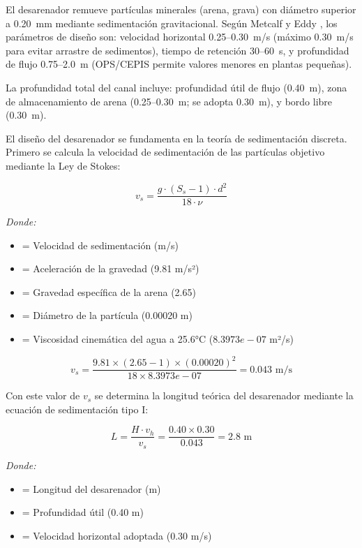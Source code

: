 \documentclass[12pt,a4paper]{article}
\begin{document}
El desarenador remueve part\'iculas minerales (arena, grava) con di\'ametro superior a 0.20~mm mediante sedimentaci\'on gravitacional. Seg\'un Metcalf y Eddy \cite{metcalf2014}, los par\'ametros de dise\~no son: velocidad horizontal 0.25--0.30~m/s (m\'aximo 0.30~m/s para evitar arrastre de sedimentos), tiempo de retenci\'on 30--60~s, y profundidad de flujo 0.75--2.0~m (OPS/CEPIS \cite{ops2005} permite valores menores en plantas peque\~nas).

La profundidad total del canal incluye: profundidad \'util de flujo (0.40~m), zona de almacenamiento de arena (0.25--0.30~m; se adopta 0.30~m), y bordo libre (0.30~m).

El dise\~no del desarenador se fundamenta en la teor\'ia de sedimentaci\'on discreta. Primero se calcula la velocidad de sedimentaci\'on de las part\'iculas objetivo mediante la Ley de Stokes:

\begin{equation}
v_s = \frac{g \cdot (S_s - 1) \cdot d^2}{18 \cdot \nu}
\end{equation}

\textit{Donde:}
\begin{itemize}[noitemsep,leftmargin=2em]
    \item[$v_s$] = Velocidad de sedimentaci\'on (m/s)
    \item[$g$] = Aceleraci\'on de la gravedad (9.81 m/s²)
    \item[$S_s$] = Gravedad espec\'ifica de la arena (2.65)
    \item[$d$] = Di\'ametro de la part\'icula (0.00020 m)
    \item[$\nu$] = Viscosidad cinem\'atica del agua a 25.6°C ($8.3973e-07$ m²/s)
\end{itemize}

\begin{equation}
v_s = \frac{9.81 \times (2.65 - 1) \times (0.00020)^2}{18 \times 8.3973e-07} = 0.043 \text{ m/s}
\end{equation}

Con este valor de $v_s$ se determina la longitud te\'orica del desarenador mediante la ecuaci\'on de sedimentaci\'on tipo I:

\begin{equation}
L = \frac{H \cdot v_h}{v_s} = \frac{0.40 \times 0.30}{0.043} = 2.8 \text{ m}
\end{equation}

\textit{Donde:}
\begin{itemize}[noitemsep,leftmargin=2em]
    \item[$L$] = Longitud del desarenador (m)
    \item[$H$] = Profundidad \'util (0.40 m)
    \item[$v_h$] = Velocidad horizontal adoptada (0.30 m/s)
\end{itemize}
\end{document}
